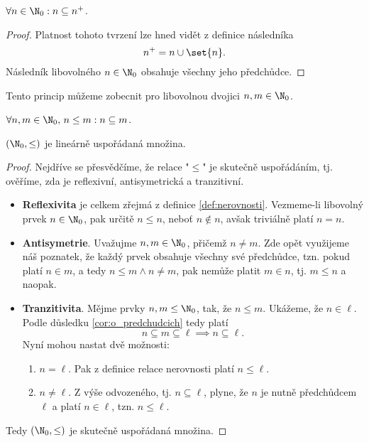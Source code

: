 \begin{lemma}\label{lem:o_predchudcich}
    $\forall n\in\N_0: n\subseteq n^+$.
\end{lemma}
\begin{proof}
    Platnost tohoto tvrzení lze hned vidět z definice následníka
    \begin{equation*}
        n^+=n\cup\set{n}.
    \end{equation*}
    Následník libovolného $n\in\N_0$ obsahuje všechny jeho předchůdce.
\end{proof}
Tento princip můžeme zobecnit pro libovolnou dvojici $n,m\in\N_0$.
\begin{corollary}\label{cor:o_predchudcich}
    $\forall n,m\in\N_0,\,n\leq m: n\subseteq m$.
\end{corollary}
\begin{theorem}
    $(\N_0,\leq)$ je lineárně uspořádaná množina.
\end{theorem}
\begin{proof}
    Nejdříve se přesvědčíme, že relace "$\leq$" je skutečně uspořádáním, tj. ověříme, zda je reflexivní, antisymetrická a tranzitivní.
    \begin{itemize}
        \item \textbf{Reflexivita} je celkem zřejmá z definice \ref{def:nerovnosti}. Vezmeme-li libovolný prvek $n\in\N_0$, pak určitě $n\leq n$, neboť $n\notin n$, avšak triviálně platí $n=n$.
        \item \textbf{Antisymetrie}. Uvažujme $n,m\in\N_0$, přičemž $n\neq m$. Zde opět využijeme náš poznatek, že každý prvek obsahuje všechny své předchůdce, tzn. pokud platí $n\in m$, a tedy $n\leq m\land n\neq m$, pak nemůže platit $m\in n$, tj. $m\leq n$ a naopak.
        \item \textbf{Tranzitivita}. Mějme prvky $n,m\leq\N_0$, tak, že $n\leq m$. Ukážeme, že $n\in\ell$. Podle důsledku \ref{cor:o_predchudcich} tedy platí
        \begin{equation*}
            n\subseteq m\subseteq\ell\implies n\subseteq\ell.
        \end{equation*}
        Nyní mohou nastat dvě možnosti:
        \begin{enumerate}[label=(\alph*)]
            \item $n=\ell$. Pak z definice relace nerovnosti platí $n\leq\ell$.
            \item $n\neq\ell$. Z výše odvozeného, tj. $n\subseteq\ell$, plyne, že $n$ je nutně předchůdcem $\ell$ a platí $n\in\ell$, tzn. $n\leq\ell$.
        \end{enumerate}
    \end{itemize}
    Tedy $(\N_0,\leq)$ je skutečně uspořádaná množina.
\end{proof}